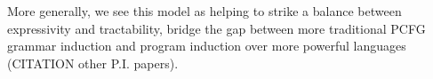 \documentclass[11pt, twocolumn]{article}
\begin{document}
More generally, we see this model as helping to strike a balance between expressivity and tractability, bridge the gap between more traditional PCFG grammar induction and program induction over more powerful languages~\cite{dechter2013bootstrap,} (CITATION other P.I. papers).






\end{document}
